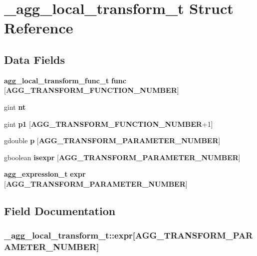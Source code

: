 \section{\+\_\+agg\+\_\+local\+\_\+transform\+\_\+t Struct Reference}
\label{struct__agg__local__transform__t}
\subsection*{Data Fields}
\begin{DoxyCompactItemize}
\item 
{\bf agg\+\_\+local\+\_\+transform\+\_\+func\+\_\+t} {\bf func} [{\bf A\+G\+G\+\_\+\+T\+R\+A\+N\+S\+F\+O\+R\+M\+\_\+\+F\+U\+N\+C\+T\+I\+O\+N\+\_\+\+N\+U\+M\+B\+E\+R}]
\item 
gint {\bf nt}
\item 
gint {\bf p1} [{\bf A\+G\+G\+\_\+\+T\+R\+A\+N\+S\+F\+O\+R\+M\+\_\+\+F\+U\+N\+C\+T\+I\+O\+N\+\_\+\+N\+U\+M\+B\+E\+R}+1]
\item 
gdouble {\bf p} [{\bf A\+G\+G\+\_\+\+T\+R\+A\+N\+S\+F\+O\+R\+M\+\_\+\+P\+A\+R\+A\+M\+E\+T\+E\+R\+\_\+\+N\+U\+M\+B\+E\+R}]
\item 
gboolean {\bf isexpr} [{\bf A\+G\+G\+\_\+\+T\+R\+A\+N\+S\+F\+O\+R\+M\+\_\+\+P\+A\+R\+A\+M\+E\+T\+E\+R\+\_\+\+N\+U\+M\+B\+E\+R}]
\item 
{\bf agg\+\_\+expression\+\_\+t} {\bf expr} [{\bf A\+G\+G\+\_\+\+T\+R\+A\+N\+S\+F\+O\+R\+M\+\_\+\+P\+A\+R\+A\+M\+E\+T\+E\+R\+\_\+\+N\+U\+M\+B\+E\+R}]
\end{DoxyCompactItemize}


\subsection{Field Documentation}
\subsubsection[{expr}]{ \+\_\+agg\+\_\+local\+\_\+transform\+\_\+t\+::expr[{\bf A\+G\+G\+\_\+\+T\+R\+A\+N\+S\+F\+O\+R\+M\+\_\+\+P\+A\+R\+A\+M\+E\+T\+E\+R\+\_\+\+N\+U\+M\+B\+E\+R}]}\label{struct__agg__local__transform__t_a007ab9ca85704259dd2cad5359d6297f}



